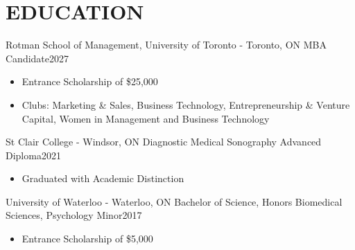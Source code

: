 
\section{\textcolor{airforceblue}{EDUCATION}}
  \employmentSubheadingListStart
    \employmentSubheading
      {Rotman School of Management, University of Toronto - Toronto, ON}{}
      {MBA Candidate}{2027}
      \begin{itemize}[leftmargin=1.5em]
        \item Entrance Scholarship of \$25,000
        \item Clubs: Marketing \& Sales, Business Technology, Entrepreneurship \& Venture Capital, Women in Management and Business Technology
      \end{itemize}
    \employmentSubheading
      {St Clair College - Windsor, ON}{}
      {Diagnostic Medical Sonography Advanced Diploma}{2021}
      \begin{itemize}[leftmargin=1.5em]
        \item Graduated with Academic Distinction
      \end{itemize}
    \employmentSubheading
      {University of Waterloo - Waterloo, ON}{}
      {Bachelor of Science, Honors Biomedical Sciences, Psychology Minor}{2017}
      \begin{itemize}[leftmargin=1.5em]
        \item Entrance Scholarship of \$5,000
      \end{itemize}
  \employmentSubheadingListEnd
  \vspace{-16pt}
